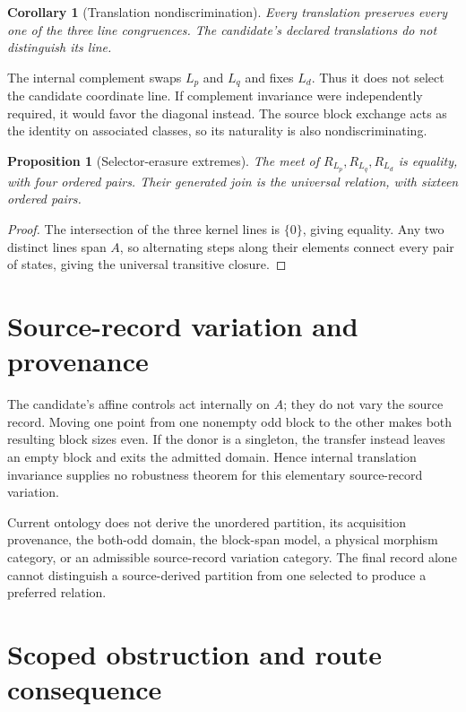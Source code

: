 \documentclass[11pt]{article}
\newtheorem{proposition}{Proposition}
\newtheorem{corollary}{Corollary}
\begin{document}
\begin{corollary}[Translation nondiscrimination]
Every translation preserves every one of the three line congruences. The
candidate's declared translations do not distinguish its line.
\end{corollary}

The internal complement swaps \(L_p\) and \(L_q\) and fixes \(L_d\). Thus it
does not select the candidate coordinate line. If complement invariance were
independently required, it would favor the diagonal instead. The source block
exchange acts as the identity on associated classes, so its naturality is
also nondiscriminating.

\begin{proposition}[Selector-erasure extremes]
The meet of \(R_{L_p},R_{L_q},R_{L_d}\) is equality, with four ordered pairs.
Their generated join is the universal relation, with sixteen ordered pairs.
\end{proposition}
\begin{proof}
The intersection of the three kernel lines is \(\{0\}\), giving equality.
Any two distinct lines span \(A\), so alternating steps along their elements
connect every pair of states, giving the universal transitive closure.
\end{proof}

\section{Source-record variation and provenance}

The candidate's affine controls act internally on \(A\); they do not vary the
source record. Moving one point from one nonempty odd block to the other makes
both resulting block sizes even. If the donor is a singleton, the transfer
instead leaves an empty block and exits the admitted domain. Hence internal
translation invariance supplies no robustness theorem for this elementary
source-record variation.

Current ontology does not derive the unordered partition, its acquisition
provenance, the both-odd domain, the block-span model, a physical morphism
category, or an admissible source-record variation category. The final record
alone cannot distinguish a source-derived partition from one selected to
produce a preferred relation.

\section{Scoped obstruction and route consequence}
\end{document}
